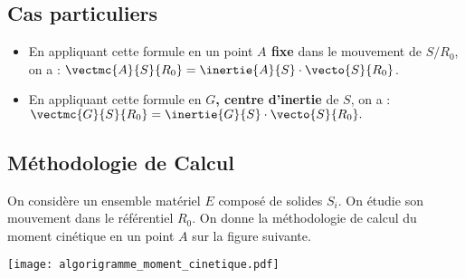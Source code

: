 
\subsection{Cas particuliers}

\begin{itemize}
\item En appliquant cette formule en un point \textbf{$A$ fixe} dans le mouvement de $S/R_0$, on a : $\vectmc{A}{S}{R_0}=\inertie{A}{S}\cdot \vecto{S}{R_0}$.
\item En appliquant cette formule en \textbf{$G$, centre d'inertie} de $S$, on a :
$
\vectmc{G}{S}{R_0}=\inertie{G}{S}\cdot \vecto{S}{R_0}.
$
\end{itemize}



\subsection{Méthodologie de Calcul}

On considère un ensemble matériel $E$ composé de solides $S_i$. On étudie son mouvement dans le référentiel $R_0$.
On donne la méthodologie de calcul du moment cinétique en un point $A$ sur la figure suivante.%

\begin{center}
\texttt{[image: algorigramme\_moment\_cinetique.pdf]}
\end{center}

